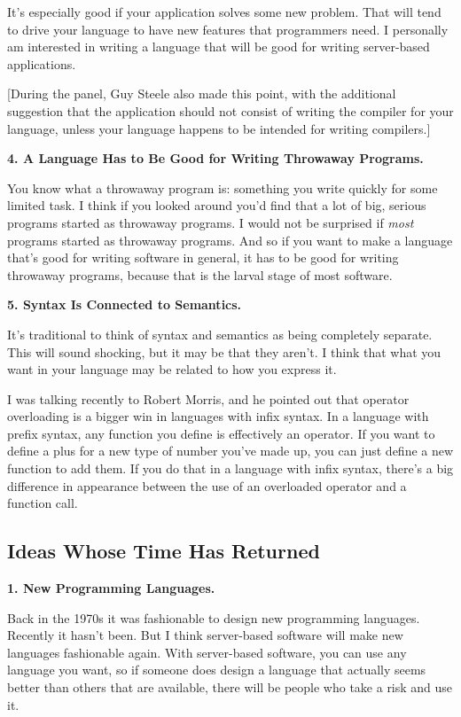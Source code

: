 It's especially good if your application solves some new problem. That
will tend to drive your language to have new features that programmers
need. I personally am interested in writing a language that will be good
for writing server-based applications.

{[}During the panel, Guy Steele also made this point, with the
additional suggestion that the application should not consist of writing
the compiler for your language, unless your language happens to be
intended for writing compilers.{]}

\textbf{4. A Language Has to Be Good for Writing Throwaway Programs.}

You know what a throwaway program is: something you write quickly for
some limited task. I think if you looked around you'd find that a lot of
big, serious programs started as throwaway programs. I would not be
surprised if \emph{most} programs started as throwaway programs. And so
if you want to make a language that's good for writing software in
general, it has to be good for writing throwaway programs, because that
is the larval stage of most software.

\textbf{5. Syntax Is Connected to Semantics.}

It's traditional to think of syntax and semantics as being completely
separate. This will sound shocking, but it may be that they aren't. I
think that what you want in your language may be related to how you
express it.

I was talking recently to Robert Morris, and he pointed out that
operator overloading is a bigger win in languages with infix syntax. In
a language with prefix syntax, any function you define is effectively an
operator. If you want to define a plus for a new type of number you've
made up, you can just define a new function to add them. If you do that
in a language with infix syntax, there's a big difference in appearance
between the use of an overloaded operator and a function call.

\subsection{Ideas Whose Time Has
Returned}\label{ideas-whose-time-has-returned}

\textbf{1. New Programming Languages.}

Back in the 1970s it was fashionable to design new programming
languages. Recently it hasn't been. But I think server-based software
will make new languages fashionable again. With server-based software,
you can use any language you want, so if someone does design a language
that actually seems better than others that are available, there will be
people who take a risk and use it.

